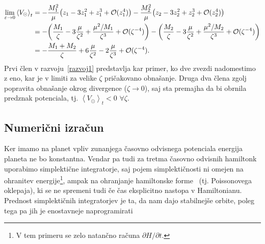 \documentclass[12pt, a4paper]{article}
\newcommand{\avgt}[1]{
	\ensuremath{\left\langle #1 \right\rangle_t}
}
\begin{document}
\begin{align}
	\lim_{\varepsilon \to 0}\avgt{V_\odot} &= -\frac{M_1^2}{\mu}\big(z_1 - 3z_1^2 + z_1^3 + \mathcal{O}(z_1^4)\big)
			-\frac{M_2^2}{\mu}\big(z_2 - 3z_2^2 + z_2^3 + \mathcal{O}(z_2^4)\big) \notag \\
	&= -\bigg(\frac{M_1}{\zeta} - 3\frac{\mu}{\zeta^2} + \frac{\mu^2/M_1}{\zeta^3} + \mathcal{O}(\zeta^{-4})\bigg)
			-\bigg(\frac{M_2}{\zeta} - 3\frac{\mu}{\zeta^2} + \frac{\mu^2/M_2}{\zeta^3} + \mathcal{O}(\zeta^{-4})\bigg)
		\notag \\
	&= -\frac{M_1 + M_2}{\zeta} + 6\frac{\mu}{\zeta^2} - 2\frac{\mu}{\zeta^3} + \mathcal{O}(\zeta^{-4}).
	\label{razvoj1}
\end{align}
Prvi \v clen v razvoju~\eqref{razvoj1} predstavlja kar primer, ko dve zvezdi nadomestimo z eno, kar je v limiti za velike
$\zeta$ pri\v cakovano obna\v sanje. Druga dva \v clena zgolj popravita obna\v sanje okrog divergence ($\zeta \to 0$),
saj sta premajha da bi obrnila predznak potenciala, tj. $\avgt{V_\odot} < 0$ $\forall \zeta$. 

\subsection{Numeri\v cni izra\v cun}
Ker imamo na planet vpliv zunanjega \v casovno odvisnega potenciala energija planeta ne bo konstantna. Vendar pa
tudi za tretma \v casovno odvisnih hamiltonk uporabimo simplekti\v cne integratorje, saj pojem simplekti\v cnosti
ni omejen na ohranitev energije\footnote{V tem primeru se zelo natan\v cno ra\v cuna $\partial H/\partial t$.}, ampak
na ohranjanje hamiltonske forme~\cite{sirca} (tj. Poissonovega oklepaja), ki se ne spremeni tudi \v ce \v cas
eksplicitno nastopa v Hamiltonianu. Prednost simplekti\v cnih integratorjev je ta, da nam dajo stabilnej\v se
orbite, poleg tega pa jih je enostavneje naprogramirati
\end{document}
